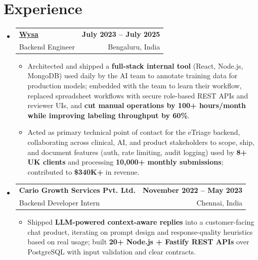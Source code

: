 \documentclass[letterpaper,10pt]{article}
\makeatletter
\newcommand{\resumeItem}[1]{
  \item\small{#1\vspace{-1pt}}
}
\newcommand{\resumeSubheading}[4]{
  \vspace{1pt}\item
    \begin{tabular*}{0.985\textwidth}[t]{l@{\extracolsep{\fill}}r}
      \textbf{#1} & \textbf{\small #2} \\
      {\small\color{ResumeSlate} #3} & {\small\color{ResumeSlate} #4} \\
    \end{tabular*}\vspace{-6pt}
}
\newcommand{\resumeSubHeadingListStart}{\begin{itemize}[leftmargin=0.0in, label={}, itemsep=2pt, topsep=2pt]}
\newcommand{\resumeSubHeadingListEnd}{\end{itemize}}
\newcommand{\resumeItemListStart}{\begin{itemize}[leftmargin=0.18in, itemsep=2pt, topsep=1pt]}
\newcommand{\resumeItemListEnd}{\end{itemize}\vspace{-4pt}}
\makeatother
\begin{document}
\section{Experience}
\resumeSubHeadingListStart
  \resumeSubheading
    {\href{https://www.wysa.io}{Wysa}}{July 2023 -- July 2025}
    {Backend Engineer}{Bengaluru, India}
    \resumeItemListStart
      \resumeItem{Architected and shipped a \textbf{full-stack internal tool} (React, Node.js, MongoDB) used daily by the AI team to annotate training data for production models; embedded with the team to learn their workflow, replaced spreadsheet workflows with secure role-based REST APIs and reviewer UIs, and \textbf{cut manual operations by 100+ hours/month while improving labeling throughput by 60\%}.}
      \resumeItem{Acted as primary technical point of contact for the eTriage backend, collaborating across clinical, AI, and product stakeholders to scope, ship, and document features (auth, rate limiting, audit logging) used by \textbf{8+ UK clients} and processing \textbf{10{,}000+ monthly submissions}; contributed to \textbf{\$340K+} in revenue.}
    \resumeItemListEnd
  \resumeSubheading
    {Cario Growth Services Pvt. Ltd.}{November 2022 -- May 2023}
    {Backend Developer Intern}{Chennai, India}
    \resumeItemListStart
      \resumeItem{Shipped \textbf{LLM-powered context-aware replies} into a customer-facing chat product, iterating on prompt design and response-quality heuristics based on real usage; built \textbf{20+ Node.js + Fastify REST APIs} over PostgreSQL with input validation and clear contracts.}
    \resumeItemListEnd
\resumeSubHeadingListEnd
\vspace{-4pt}
\end{document}
